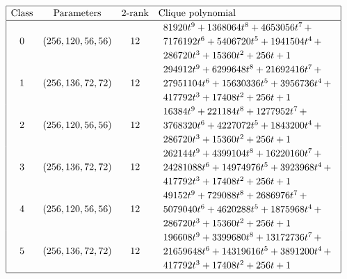 \documentclass[12pt,a4paper]{article}
\begin{document}
\begin{table}[!bhpt] %
%
\small{}
\begin{align*}
\def\arraystretch{1.2}
\begin{array}{|cccl|}
\hline
\text{Class} &
\text{Parameters} &
\text{2-rank} &
\text{Clique polynomial}
\\
\hline
0 &
(256, 120, 56, 56) &
12 &
\begin{array}{l}
81920t^{9} + 1368064t^{8} + 4653056t^{7}
\,+
\\
 7176192t^{6} + 5406720t^{5} + 1941504t^{4}
\,+
\\
 286720t^{3} + 15360t^{2} + 256t + 1
\end{array}
\\
1 &
(256, 136, 72, 72) &
12 &
\begin{array}{l}
294912t^{9} + 6299648t^{8} + 21692416t^{7}
\,+
\\
 27951104t^{6} + 15630336t^{5} + 3956736t^{4}
\,+
\\
 417792t^{3} + 17408t^{2} + 256t + 1
\end{array}
\\
2 &
(256, 120, 56, 56) &
12 &
\begin{array}{l}
16384t^{9} + 221184t^{8} + 1277952t^{7}
\,+
\\
 3768320t^{6} + 4227072t^{5} + 1843200t^{4}
\,+
\\
 286720t^{3} + 15360t^{2} + 256t + 1
\end{array}
\\
3 &
(256, 136, 72, 72) &
12 &
\begin{array}{l}
262144t^{9} + 4399104t^{8} + 16220160t^{7}
\,+
\\
 24281088t^{6} + 14974976t^{5} + 3923968t^{4}
\,+
\\
 417792t^{3} + 17408t^{2} + 256t + 1
\end{array}
\\
4 &
(256, 120, 56, 56) &
12 &
\begin{array}{l}
49152t^{9} + 729088t^{8} + 2686976t^{7}
\,+
\\
 5079040t^{6} + 4620288t^{5} + 1875968t^{4}
\,+
\\
 286720t^{3} + 15360t^{2} + 256t + 1
\end{array}
\\
5 &
(256, 136, 72, 72) &
12 &
\begin{array}{l}
196608t^{9} + 3399680t^{8} + 13172736t^{7}
\,+
\\
 21659648t^{6} + 14319616t^{5} + 3891200t^{4}
\,+
\\
 417792t^{3} + 17408t^{2} + 256t + 1
\end{array}
\\
\hline
\end{array}
\end{align*}
%
\caption{$[f_{8,3}]$ extended Cayley classes.}
\label{tab-c8_3_EC_classes}
\end{table}
\end{document}
